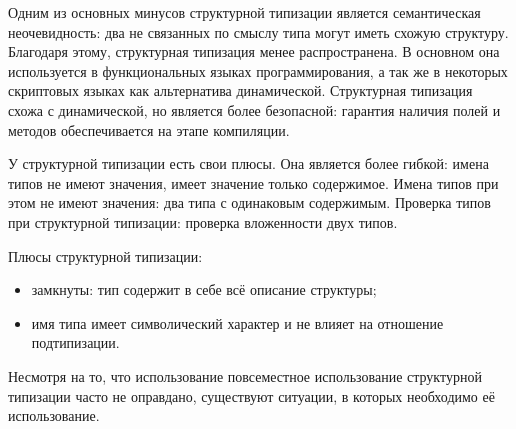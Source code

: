 Одним из основных минусов структурной типизации является семантическая неочевидность: два не связанных по смыслу типа могут иметь схожую структуру. Благодаря этому, структурная типизация менее распространена. В основном она используется в функциональных языках программирования, а так же в некоторых скриптовых языках как альтернатива динамической. Структурная типизация схожа с динамической, но является более безопасной: гарантия наличия полей и методов обеспечивается на этапе компиляции.

У структурной типизации есть свои плюсы. Она является более гибкой: имена типов не имеют значения, имеет значение только содержимое. Имена типов при этом не имеют значения: два типа с одинаковым содержимым. Проверка типов при структурной типизации: проверка вложенности двух типов.

Плюсы структурной типизации:
\begin{itemize}
    \item замкнуты: тип содержит в себе всё описание структуры;
    \item имя типа имеет символический характер и не влияет на отношение подтипизации.
\end{itemize}

Несмотря на то, что использование повсеместное использование структурной типизации часто не оправдано, существуют ситуации, в которых необходимо её использование.
